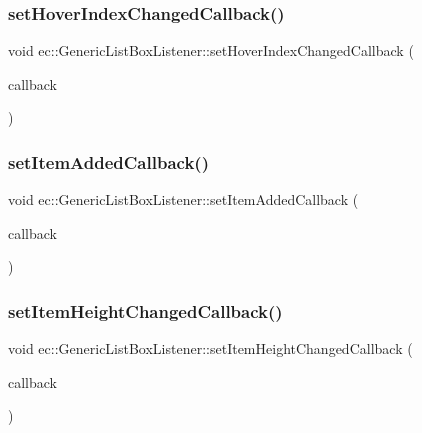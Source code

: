 \subsubsection{\texorpdfstring{set\+Hover\+Index\+Changed\+Callback()}{setHoverIndexChangedCallback()}}
{\footnotesize\ttfamily void ec\+::\+Generic\+List\+Box\+Listener\+::set\+Hover\+Index\+Changed\+Callback (\begin{DoxyParamCaption}\item[{const \mbox{\hyperlink{classec_1_1_generic_list_box_listener_ac1e0c2bb89e7c14f6b201450d372722b}{Hover\+Index\+Changed\+\_\+\+Callback}} \&}]{callback }\end{DoxyParamCaption})}

\mbox{\label{classec_1_1_generic_list_box_listener_afd3c4f826d526d19f4074f4a382f1372}} 
\subsubsection{\texorpdfstring{set\+Item\+Added\+Callback()}{setItemAddedCallback()}}
{\footnotesize\ttfamily void ec\+::\+Generic\+List\+Box\+Listener\+::set\+Item\+Added\+Callback (\begin{DoxyParamCaption}\item[{const \mbox{\hyperlink{classec_1_1_generic_list_box_listener_a9dcfd35af8971efa652ced675ac1f28d}{Item\+Added\+\_\+\+Callback}} \&}]{callback }\end{DoxyParamCaption})}

\mbox{\label{classec_1_1_generic_list_box_listener_a41a4c91d77d0b3470147489b09c7d140}} 
\subsubsection{\texorpdfstring{set\+Item\+Height\+Changed\+Callback()}{setItemHeightChangedCallback()}}
{\footnotesize\ttfamily void ec\+::\+Generic\+List\+Box\+Listener\+::set\+Item\+Height\+Changed\+Callback (\begin{DoxyParamCaption}\item[{const \mbox{\hyperlink{classec_1_1_generic_list_box_listener_aaba7b764c07b0c7cffd9b880bdf46358}{Item\+Height\+Changed\+\_\+\+Callback}} \&}]{callback }\end{DoxyParamCaption})}

